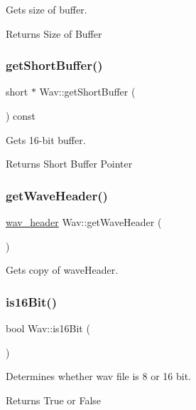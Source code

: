 Gets size of buffer. \begin{DoxyReturn}{Returns}
Size of Buffer 
\end{DoxyReturn}
\mbox{\label{classWav_a24c23c9823a08c0ff1a2a39427b36135}} 
\subsubsection{\texorpdfstring{get\+Short\+Buffer()}{getShortBuffer()}}
{\footnotesize\ttfamily short $\ast$ Wav\+::get\+Short\+Buffer (\begin{DoxyParamCaption}{ }\end{DoxyParamCaption}) const}

Gets 16-\/bit buffer. \begin{DoxyReturn}{Returns}
Short Buffer Pointer 
\end{DoxyReturn}
\mbox{\label{classWav_a7b640870f22bd813b1f211c9ef3139ec}} 
\subsubsection{\texorpdfstring{get\+Wave\+Header()}{getWaveHeader()}}
{\footnotesize\ttfamily \hyperlink{structwav__header}{wav\+\_\+header} Wav\+::get\+Wave\+Header (\begin{DoxyParamCaption}{ }\end{DoxyParamCaption})}

Gets copy of wave\+Header. \mbox{\label{classWav_a476a9bed5c03843098b7ecf67d5afeaf}} 
\subsubsection{\texorpdfstring{is16\+Bit()}{is16Bit()}}
{\footnotesize\ttfamily bool Wav\+::is16\+Bit (\begin{DoxyParamCaption}{ }\end{DoxyParamCaption})}

Determines whether wav file is 8 or 16 bit. \begin{DoxyReturn}{Returns}
True or False 
\end{DoxyReturn}
\mbox{\label{classWav_ad933a085980a47031c91a91f9a3539ff}} 

